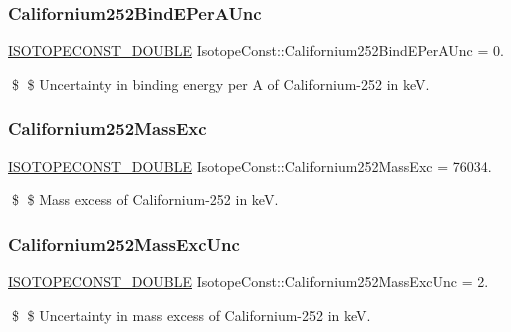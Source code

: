 \subsubsection{\texorpdfstring{Californium252\+Bind\+E\+Per\+A\+Unc}{Californium252BindEPerAUnc}}
{\footnotesize\ttfamily \mbox{\hyperlink{group___isotope_const-_macros_ga8f45a7272ce02c0b4c65c44636ed719a}{I\+S\+O\+T\+O\+P\+E\+C\+O\+N\+S\+T\+\_\+\+D\+O\+U\+B\+LE}} Isotope\+Const\+::\+Californium252\+Bind\+E\+Per\+A\+Unc = 0.}

\$ \$ Uncertainty in binding energy per A of Californium-\/252 in keV. \mbox{\label{group___isotope_const-_californium-_cf252_ga1abf2031646f1ad2c4d41ce056110510}} 
\subsubsection{\texorpdfstring{Californium252\+Mass\+Exc}{Californium252MassExc}}
{\footnotesize\ttfamily \mbox{\hyperlink{group___isotope_const-_macros_ga8f45a7272ce02c0b4c65c44636ed719a}{I\+S\+O\+T\+O\+P\+E\+C\+O\+N\+S\+T\+\_\+\+D\+O\+U\+B\+LE}} Isotope\+Const\+::\+Californium252\+Mass\+Exc = 76034.}

\$ \$ Mass excess of Californium-\/252 in keV. \mbox{\label{group___isotope_const-_californium-_cf252_ga91ee9d6b5e45e80a04c1e4c35670fdba}} 
\subsubsection{\texorpdfstring{Californium252\+Mass\+Exc\+Unc}{Californium252MassExcUnc}}
{\footnotesize\ttfamily \mbox{\hyperlink{group___isotope_const-_macros_ga8f45a7272ce02c0b4c65c44636ed719a}{I\+S\+O\+T\+O\+P\+E\+C\+O\+N\+S\+T\+\_\+\+D\+O\+U\+B\+LE}} Isotope\+Const\+::\+Californium252\+Mass\+Exc\+Unc = 2.}

\$ \$ Uncertainty in mass excess of Californium-\/252 in keV. \mbox{\label{group___isotope_const-_californium-_cf252_ga31148d77060e26b2a9c4369d3d0e92df}} 

